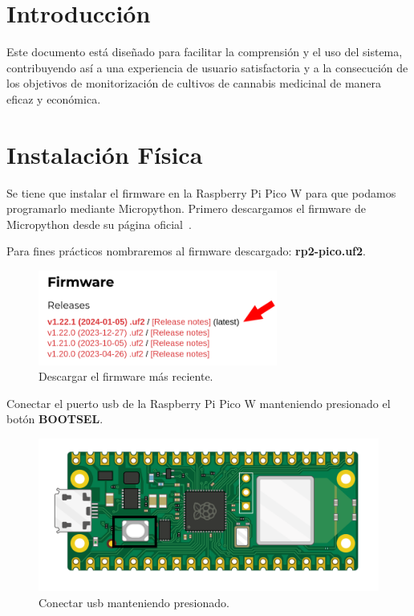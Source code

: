 
\section{Introducción}

Este documento está diseñado para facilitar la comprensión y el uso del sistema, contribuyendo así a una experiencia de usuario satisfactoria y a la consecución de los objetivos de monitorización de cultivos de cannabis medicinal de manera eficaz y económica.


\section{Instalación Física}
Se tiene que instalar el firmware en la Raspberry Pi Pico W para que podamos programarlo mediante Micropython.
Primero descargamos el firmware de Micropython desde su página oficial~\cite{misc:MicropythonFirmware}.

Para fines prácticos nombraremos al firmware descargado: \textbf{rp2-pico.uf2}.

\begin{figure}[h]
\centering
\includegraphics[width=0.7\textwidth]{img/herramientas/micropython_firmware.png}
\caption{Descargar el firmware más reciente.}
\end{figure}

Conectar el puerto usb de la Raspberry Pi Pico W manteniendo presionado el botón \textbf{BOOTSEL}.

\begin{figure}[h]
\centering
\includegraphics[width=1\textwidth]{img/herramientas/rpipicow_boton.png}
\caption{Conectar usb manteniendo presionado.}
\end{figure}

